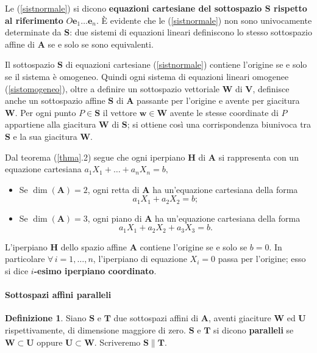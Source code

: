 \documentclass{article}
\theoremstyle{plain}
\theoremstyle{definition}
\newtheorem{defn}{Definizione}[section]
\theoremstyle{remark}
\begin{document}
\vspace{10pt}

Le (\ref{sistnormale}) si dicono \textbf{equazioni cartesiane del sottospazio $\mathbf{S}$ rispetto al riferimento} $O\mathbf{e}_1\ldots\mathbf{e}_n$. 
È evidente che le (\ref{sistnormale}) non sono univocamente determinate da $\mathbf{S}$: due sistemi di equazioni lineari definiscono lo 
stesso sottospazio affine di $\mathbf{A}$ se e solo se sono equivalenti.

\vspace{10pt}

Il sottospazio $\mathbf{S}$ di equazioni cartesiane (\ref{sistnormale}) contiene l'origine se e solo se il sistema è omogeneo. 
Quindi ogni sistema di equazioni lineari omogenee (\ref{sistomogeneo}), oltre a definire un sottospazio vettoriale $\mathbf{W}$ di $\mathbf{V}$, 
definisce anche un sottospazio affine $\mathbf{S}$ di $\mathbf{A}$ passante per l'origine e avente per giacitura $\mathbf{W}$. 
Per ogni punto $P\in\mathbf{S}$ il vettore $\mathbf{w}\in\mathbf{W}$ avente le stesse coordinate di $P$ appartiene alla giacitura $\mathbf{W}$ di $\mathbf{S}$; si ottiene
così una corrispondenza biunivoca tra $\mathbf{S}$ e la sua giacitura $\mathbf{W}$.

\vspace{10pt}

Dal teorema (\ref{thma}.2) segue che ogni iperpiano $\mathbf{H}$ di $\mathbf{A}$ si rappresenta con un equazione cartesiana $a_1X_1+\ldots+a_nX_n=b,$
\begin{itemize}
    \item Se $\dim(\mathbf{A})=2$, ogni retta di $\mathbf{A}$ ha un'equazione cartesiana della forma \[a_1X_1+a_2X_2=b;\]
    \item Se $\dim(\mathbf{A})=3$, ogni piano di $\mathbf{A}$ ha un'equazione cartesiana della forma \[a_1X_1+a_2X_2+a_3X_3=b.\]
\end{itemize}
L'iperpiano $\mathbf{H}$ dello spazio affine $\mathbf{A}$ contiene l'origine se e solo se $b=0$. 
In particolare $\forall\,i=1,\ldots,n$, l'iperpiano di equazione $X_i=0$ passa per l'origine; esso si dice \textbf{$i$-esimo iperpiano coordinato}.

\vspace{10pt}

\paragraph{Sottospazi affini paralleli}
\begin{bxthm}
\begin{defn}
    Siano $\mathbf{S}$ e $\mathbf{T}$ due sottospazi affini di $\mathbf{A}$, aventi giaciture $\mathbf{W}$ ed $\mathbf{U}$ rispettivamente, di dimensione maggiore di zero.
    $\mathbf{S}$ e $\mathbf{T}$ si dicono \textbf{paralleli} se $\mathbf{W}\subset\mathbf{U}$ oppure $\mathbf{U}\subset\mathbf{W}$. Scriveremo $\mathbf{S}\parallel \mathbf{T}$.
\end{defn}    
\end{bxthm}
\end{document}
